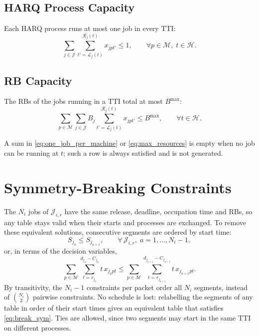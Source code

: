 \documentclass[11pt]{article}
\begin{document}
\subsection*{HARQ Process Capacity}

Each HARQ process runs at most one job in every TTI:
\begin{equation}
\sum_{j\in\mathcal J} \sum_{t'=\mathcal{L}_j(t)}^{\mathcal{R}_j(t)} x_{jpt'} \le 1,
\qquad \forall p\in\mathcal M,\; t\in\mathcal H.
\label{eq:one_job_per_machine}
\end{equation}

\subsection*{RB Capacity}

The RBs of the jobs running in a TTI total at most $B^{\max}$:
\begin{equation}
\sum_{p\in\mathcal M} \sum_{j\in\mathcal J} B_j
\sum_{t'=\mathcal{L}_j(t)}^{\mathcal{R}_j(t)} x_{jpt'}
\le B^{\max},
\qquad \forall t\in\mathcal H.
\label{eq:max_resources}
\end{equation}

A sum in \eqref{eq:one_job_per_machine} or \eqref{eq:max_resources} is empty
when no job can be running at $t$; such a row is always satisfied and is not
generated.


\section{Symmetry-Breaking Constraints}\label{sec:sym}

The $N_i$ jobs of $\mathcal{J}_{i,r}$ have the same release, deadline,
occupation time and RBs, so any table stays valid when their starts and
processes are exchanged. To remove these equivalent solutions, consecutive
segments are ordered by start time:
\begin{equation}
S_{j_a} \le S_{j_{a+1}},
\qquad \forall\, \mathcal{J}_{i,r},\; a = 1, \dots, N_i - 1,
\label{eq:break_sym}
\end{equation}
or, in terms of the decision variables,
\[
\sum_{p\in\mathcal M} \sum_{t=r_{j_a}}^{d_{j_a}-C_{j_a}} t \, x_{j_a p t}
\le
\sum_{p\in\mathcal M} \sum_{t=r_{j_{a+1}}}^{d_{j_{a+1}}-C_{j_{a+1}}} t \, x_{j_{a+1} p t}.
\]
By transitivity, the $N_i - 1$ constraints per packet order all $N_i$
segments, instead of $\binom{N_i}{2}$ pairwise constraints. No schedule is
lost: relabelling the segments of any table in order of their start times
gives an equivalent table that satisfies \eqref{eq:break_sym}. Ties are
allowed, since two segments may start in the same TTI on different processes.
\end{document}

